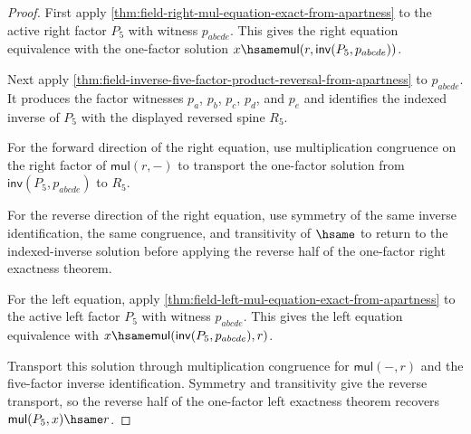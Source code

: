 \begin{proof}
First apply \autoref{thm:field-right-mul-equation-exact-from-apartness} to the
active right factor $P_5$ with witness $p_{abcde}$. This gives the right
equation equivalence with the one-factor solution
$x\hsame\mathsf{mul}(r,\mathsf{inv}(P_5,p_{abcde}))$.

Next apply
\autoref{thm:field-inverse-five-factor-product-reversal-from-apartness} to
$p_{abcde}$. It produces the factor witnesses $p_a$, $p_b$, $p_c$, $p_d$, and
$p_e$ and identifies the indexed inverse of $P_5$ with the displayed reversed
spine $R_5$.

For the forward direction of the right equation, use multiplication congruence
on the right factor of $\mathsf{mul}(r,-)$ to transport the one-factor solution
from $\mathsf{inv}(P_5,p_{abcde})$ to $R_5$.

For the reverse direction of the right equation, use symmetry of the same
inverse identification, the same congruence, and transitivity of $\hsame$ to
return to the indexed-inverse solution before applying the reverse half of the
one-factor right exactness theorem.

For the left equation, apply
\autoref{thm:field-left-mul-equation-exact-from-apartness} to the active left
factor $P_5$ with witness $p_{abcde}$. This gives the left equation equivalence
with $x\hsame\mathsf{mul}(\mathsf{inv}(P_5,p_{abcde}),r)$.

Transport this solution through multiplication congruence for
$\mathsf{mul}(-,r)$ and the five-factor inverse identification. Symmetry and
transitivity give the reverse transport, so the reverse half of the one-factor
left exactness theorem recovers $\mathsf{mul}(P_5,x)\hsame r$.
\end{proof}
